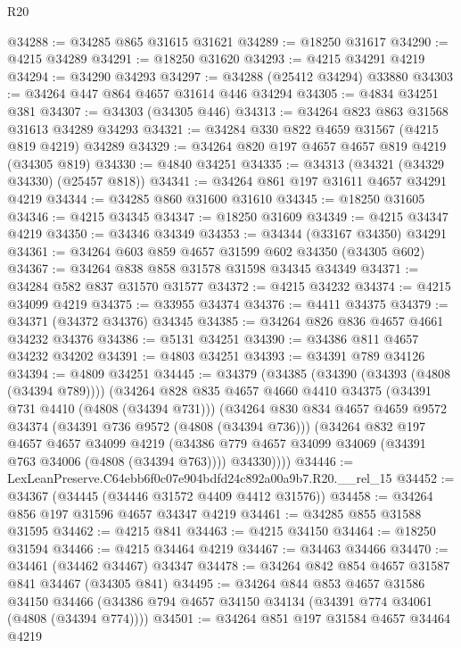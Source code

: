 \begin{lexlean}{R20}
\begin{coremodule}
@34288 := @34285 @865 @31615 @31621
@34289 := @18250 @31617
@34290 := @4215 @34289
@34291 := @18250 @31620
@34293 := @4215 @34291 @4219
@34294 := @34290 @34293
@34297 := @34288 (@25412 @34294) @33880
@34303 := @34264 @447 @864 @4657 @31614 @446 @34294
@34305 := @4834 @34251 @381
@34307 := @34303 (@34305 @446)
@34313 := @34264 @823 @863 @31568 @31613 @34289 @34293
@34321 := @34284 @330 @822 @4659 @31567 (@4215 @819 @4219) @34289
@34329 := @34264 @820 @197 @4657 @4657 @819 @4219 (@34305 @819)
@34330 := @4840 @34251
@34335 := @34313 (@34321 (@34329 @34330) (@25457 @818))
@34341 := @34264 @861 @197 @31611 @4657 @34291 @4219
@34344 := @34285 @860 @31600 @31610
@34345 := @18250 @31605
@34346 := @4215 @34345
@34347 := @18250 @31609
@34349 := @4215 @34347 @4219
@34350 := @34346 @34349
@34353 := @34344 (@33167 @34350) @34291
@34361 := @34264 @603 @859 @4657 @31599 @602 @34350 (@34305 @602)
@34367 := @34264 @838 @858 @31578 @31598 @34345 @34349
@34371 := @34284 @582 @837 @31570 @31577
@34372 := @4215 @34232
@34374 := @4215 @34099 @4219
@34375 := @33955 @34374
@34376 := @4411 @34375
@34379 := @34371 (@34372 @34376) @34345
@34385 := @34264 @826 @836 @4657 @4661 @34232 @34376
@34386 := @5131 @34251
@34390 := @34386 @811 @4657 @34232 @34202
@34391 := @4803 @34251
@34393 := @34391 @789 @34126
@34394 := @4809 @34251
@34445 := @34379
    (@34385
      (@34390 (@34393 (@4808 (@34394 @789))))
      (@34264
        @828
        @835
        @4657
        @4660
        @4410
        @34375
        (@34391 @731 @4410 (@4808 (@34394 @731)))
        (@34264
          @830
          @834
          @4657
          @4659
          @9572
          @34374
          (@34391 @736 @9572 (@4808 (@34394 @736)))
          (@34264
            @832
            @197
            @4657
            @4657
            @34099
            @4219
            (@34386 @779 @4657 @34099 @34069 (@34391 @763 @34006 (@4808 (@34394 @763))))
            @34330))))
@34446 := LexLeanPreserve.C64ebb6f0c07e904bdfd24c892a00a9b7.R20.__rel_15
@34452 := @34367 (@34445 (@34446 @31572 @4409 @4412 @31576))
@34458 := @34264 @856 @197 @31596 @4657 @34347 @4219
@34461 := @34285 @855 @31588 @31595
@34462 := @4215 @841
@34463 := @4215 @34150
@34464 := @18250 @31594
@34466 := @4215 @34464 @4219
@34467 := @34463 @34466
@34470 := @34461 (@34462 @34467) @34347
@34478 := @34264 @842 @854 @4657 @31587 @841 @34467 (@34305 @841)
@34495 := @34264
    @844
    @853
    @4657
    @31586
    @34150
    @34466
    (@34386 @794 @4657 @34150 @34134 (@34391 @774 @34061 (@4808 (@34394 @774))))
@34501 := @34264 @851 @197 @31584 @4657 @34464 @4219

\end{coremodule}
\end{lexlean}
